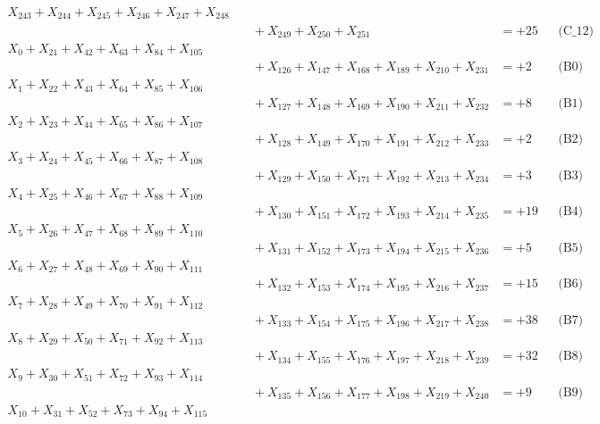 \documentclass[a4paper,10pt]{article}
\begin{document}
{\begin{align}
X_{243} + X_{244} + X_{245} + X_{246} + X_{247} + X_{248} \\[0.1ex]
&\quad  + X_{249} + X_{250} + X_{251} &= +25 && \text{(C\_12)} \\
X_{0} + X_{21} + X_{42} + X_{63} + X_{84} + X_{105} \\[0.1ex]
&\quad  + X_{126} + X_{147} + X_{168} + X_{189} + X_{210} + X_{231} &= +2 && \text{(B0)} \\
X_{1} + X_{22} + X_{43} + X_{64} + X_{85} + X_{106} \\[0.1ex]
&\quad  + X_{127} + X_{148} + X_{169} + X_{190} + X_{211} + X_{232} &= +8 && \text{(B1)} \\
X_{2} + X_{23} + X_{44} + X_{65} + X_{86} + X_{107} \\[0.1ex]
&\quad  + X_{128} + X_{149} + X_{170} + X_{191} + X_{212} + X_{233} &= +2 && \text{(B2)} \\
\allowbreak
X_{3} + X_{24} + X_{45} + X_{66} + X_{87} + X_{108} \\[0.1ex]
&\quad  + X_{129} + X_{150} + X_{171} + X_{192} + X_{213} + X_{234} &= +3 && \text{(B3)} \\
X_{4} + X_{25} + X_{46} + X_{67} + X_{88} + X_{109} \\[0.1ex]
&\quad  + X_{130} + X_{151} + X_{172} + X_{193} + X_{214} + X_{235} &= +19 && \text{(B4)} \\
X_{5} + X_{26} + X_{47} + X_{68} + X_{89} + X_{110} \\[0.1ex]
&\quad  + X_{131} + X_{152} + X_{173} + X_{194} + X_{215} + X_{236} &= +5 && \text{(B5)} \\
X_{6} + X_{27} + X_{48} + X_{69} + X_{90} + X_{111} \\[0.1ex]
&\quad  + X_{132} + X_{153} + X_{174} + X_{195} + X_{216} + X_{237} &= +15 && \text{(B6)} \\
X_{7} + X_{28} + X_{49} + X_{70} + X_{91} + X_{112} \\[0.1ex]
&\quad  + X_{133} + X_{154} + X_{175} + X_{196} + X_{217} + X_{238} &= +38 && \text{(B7)} \\
\allowbreak
X_{8} + X_{29} + X_{50} + X_{71} + X_{92} + X_{113} \\[0.1ex]
&\quad  + X_{134} + X_{155} + X_{176} + X_{197} + X_{218} + X_{239} &= +32 && \text{(B8)} \\
X_{9} + X_{30} + X_{51} + X_{72} + X_{93} + X_{114} \\[0.1ex]
&\quad  + X_{135} + X_{156} + X_{177} + X_{198} + X_{219} + X_{240} &= +9 && \text{(B9)} \\
X_{10} + X_{31} + X_{52} + X_{73} + X_{94} + X_{115} \\[0.1ex]

\end{align}}
\end{document}

